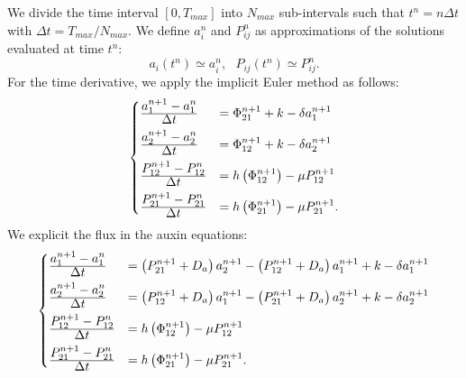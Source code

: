 We divide the time interval $\left[0, T_{max}\right]$ into $N_{max}$ sub-intervals such that $t^n = n \Delta t$ with $\Delta t = T_{max} / N_{max}  $. We define $a_i^n$ and $P_{ij}^n$ as approximations of the solutions evaluated at time $t^n$:
\begin{equation}
  a_i\left( t^n \right) \simeq a_i^n, \ \ \ P_{ij}\left( t^n \right) \simeq P_{ij}^n.
\end{equation}
For the time derivative, we apply the implicit Euler method as follows:
\begin{equation}\label{eq:SIEuler}\begin{aligned}
\begin{cases}
  {\displaystyle a_1^{n+1} - a_1^n\over\displaystyle \Delta t} & = \Phi_{21}^{n+1} + k - \delta a_1^{n+1} \\[6pt]
  {\displaystyle a_2^{n+1} - a_2^n \over\displaystyle \Delta t} & = \Phi_{12}^{n+1} + k - \delta a_2^{n+1} \\[6pt]
  {\displaystyle P_{12}^{n+1} - P_{12}^{n} \over\displaystyle \Delta t} & = h\left(\Phi_{12}^{n+1}\right) - \mu P_{12}^{n+1} \\[6pt]
  {\displaystyle P_{21}^{n+1} - P_{21}^{n} \over\displaystyle \Delta t} & = h\left(\Phi_{21}^{n+1}\right) - \mu P_{21}^{n+1}.
\end{cases}
\end{aligned} \end{equation}
We explicit the flux in the auxin equations:
\begin{equation} \label{eq:2cell_auxPIN}\begin{aligned}
  \begin{cases}
    {\displaystyle a_1^{n+1} - a_1^n\over\displaystyle \Delta t}  & = \left( P_{21}^{n+1} + D_a \right) a_2^{n+1} - \left( P_{12}^{n+1} + D_a \right) a_1^{n+1} + k - \delta a_1^{n+1} \\[6pt]
    {\displaystyle a_2^{n+1} - a_2^n \over\displaystyle \Delta t} & = \left( P_{12}^{n+1} + D_a \right) a_1^{n+1} - \left( P_{21}^{n+1} + D_a \right) a_2^{n+1} + k - \delta a_2^{n+1} \\[6pt]
    {\displaystyle P_{12}^{n+1} - P_{12}^{n} \over\displaystyle \Delta t} & = h\left(\Phi_{12}^{n+1}\right) - \mu P_{12}^{n+1} \\[6pt]
    {\displaystyle P_{21}^{n+1} - P_{21}^{n} \over\displaystyle \Delta t} & = h\left(\Phi_{21}^{n+1}\right) - \mu P_{21}^{n+1}.
  \end{cases}
\end{aligned}\end{equation}

